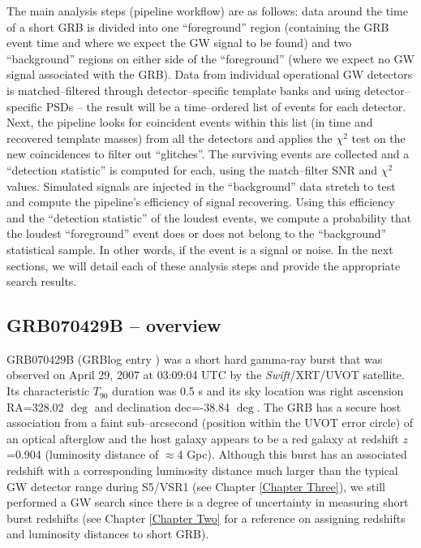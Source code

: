 The main analysis steps (pipeline workflow) are as follows: data around the time of a short GRB is divided into one ``foreground'' region (containing the GRB event time and where we expect the GW signal to be found) and two ``background'' regions on either side of the ``foreground'' (where we expect no GW signal associated with the GRB). Data from individual operational GW detectors is matched--filtered through detector--specific template banks and using detector--specific PSDs -- the result will be a time--ordered list of events for each detector. Next, the pipeline looks for coincident events within this list (in time and recovered template masses) from all the detectors and applies the $\chi^2$ test on the new coincidences to filter out ``glitches''. The surviving events are collected and a ``detection statistic'' is computed for each, using the match--filter SNR and $\chi^2$ values. Simulated signals are injected in the ``background'' data stretch to test and compute the pipeline's efficiency of signal recovering. Using this efficiency and the ``detection statistic'' of the loudest events, we compute a probability that the loudest ``foreground'' event does or does not belong to the ``background'' statistical sample. In other words, if the event is a signal or noise. In the next sections, we will detail each of these analysis steps and provide the appropriate search results.

\subsection{GRB070429B -- overview}
\label{grb070429boverview}

GRB070429B (GRBlog entry \cite{070429b}) was a short hard gamma-ray burst that was observed on April 29, 2007 at 03:09:04 UTC by the \emph{Swift}/XRT/UVOT satellite. Its characteristic $T_{90}$ duration was 0.5 s and its sky location was right ascension RA=328.02 $\deg$ and declination dec=-38.84 $\deg$. The GRB has a secure host association from a faint sub--arcsecond (position within the UVOT error circle) of an optical afterglow and the host galaxy appears to be a red galaxy \cite{Cenko:2008vt} at redshift $z$=0.904 (luminosity distance of $\approx$4 Gpc). Although this burst has an associated redshift with a corresponding luminosity distance much larger than the typical GW detector range during S5/VSR1 (see Chapter \ref{Chapter Three}), we still performed a GW search since there is a degree of uncertainty in measuring short burst redshifts (see Chapter \ref{Chapter Two} for a reference on assigning redshifts and luminosity distances to short GRB). 

